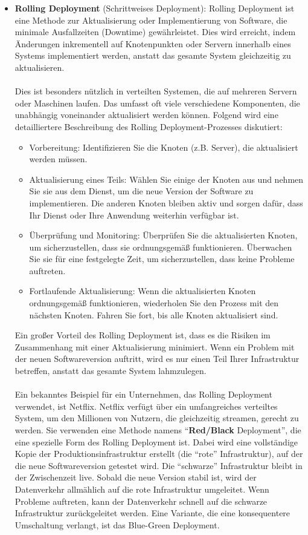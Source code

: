 \begin{itemize} 
\item \textbf{Rolling Deployment} (Schrittweises Deployment):
Rolling Deployment ist eine Methode zur Aktualisierung oder Implementierung von Software, die minimale Ausfallzeiten (Downtime) gewährleistet. Dies wird erreicht, indem Änderungen inkrementell auf Knotenpunkten oder Servern innerhalb eines Systems implementiert werden, anstatt das gesamte System gleichzeitig zu aktualisieren.
\\\\
Dies ist besonders nützlich in verteilten Systemen, die auf mehreren Servern oder Maschinen laufen. Das umfasst oft viele verschiedene Komponenten, die unabhängig voneinander aktualisiert werden können.
Folgend wird eine detailliertere Beschreibung des Rolling Deployment-Prozesses diskutiert:
\begin{itemize} 
\item Vorbereitung: Identifizieren Sie die Knoten (z.B. Server), die aktualisiert werden müssen.
\item Aktualisierung eines Teils: Wählen Sie einige der Knoten aus und nehmen Sie sie aus dem Dienst, um die neue Version der Software zu implementieren. Die anderen Knoten bleiben aktiv und sorgen dafür, dass Ihr Dienst oder Ihre Anwendung weiterhin verfügbar ist.
\item Überprüfung und Monitoring: Überprüfen Sie die aktualisierten Knoten, um sicherzustellen, dass sie ordnungsgemäß funktionieren. Überwachen Sie sie für eine festgelegte Zeit, um sicherzustellen, dass keine Probleme auftreten.
\item Fortlaufende Aktualisierung: Wenn die aktualisierten Knoten ordnungsgemäß funktionieren, wiederholen Sie den Prozess mit den nächsten Knoten. Fahren Sie fort, bis alle Knoten aktualisiert sind.
\end{itemize} 
Ein großer Vorteil des Rolling Deployment ist, dass es die Risiken im Zusammenhang mit einer Aktualisierung minimiert. Wenn ein Problem mit der neuen Softwareversion auftritt, wird es nur einen Teil Ihrer Infrastruktur betreffen, anstatt das gesamte System lahmzulegen.
\\\\
Ein bekanntes Beispiel für ein Unternehmen, das Rolling Deployment verwendet, ist Netflix. Netflix verfügt über ein umfangreiches verteiltes System, um den Millionen von Nutzern, die gleichzeitig streamen, gerecht zu werden. Sie verwenden eine Methode namens \enquote{\textbf{Red/Black} Deployment}, die eine spezielle Form des Rolling Deployment ist. Dabei wird eine vollständige Kopie der Produktionsinfrastruktur erstellt (die \enquote{rote} Infrastruktur), auf der die neue Softwareversion getestet wird. Die \enquote{schwarze} Infrastruktur bleibt in der Zwischenzeit live. Sobald die neue Version stabil ist, wird der Datenverkehr allmählich auf die rote Infrastruktur umgeleitet. Wenn Probleme auftreten, kann der Datenverkehr schnell auf die schwarze Infrastruktur zurückgeleitet werden. Eine Variante, die eine konsequentere Umschaltung verlangt, ist das Blue-Green Deployment.

\end{itemize}
